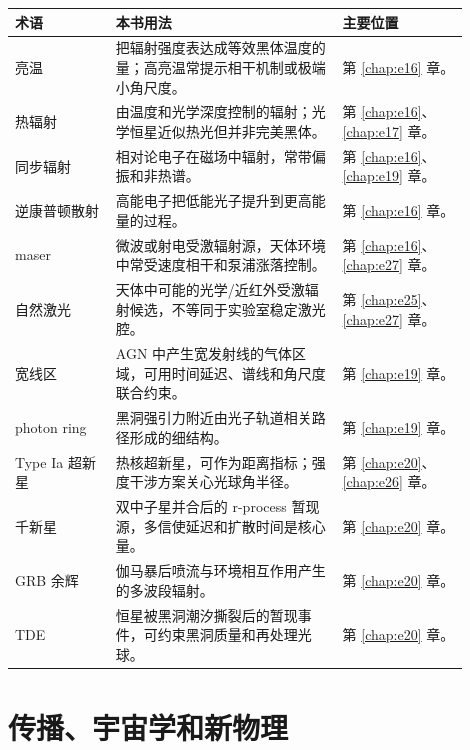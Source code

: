 \begin{longtable}{p{0.20\linewidth}p{0.45\linewidth}p{0.25\linewidth}}
\toprule
术语 & 本书用法 & 主要位置 \\
\midrule
亮温 & 把辐射强度表达成等效黑体温度的量；高亮温常提示相干机制或极端小角尺度。 & 第 \ref{chap:e16} 章。 \\
热辐射 & 由温度和光学深度控制的辐射；光学恒星近似热光但并非完美黑体。 & 第 \ref{chap:e16}、\ref{chap:e17} 章。 \\
同步辐射 & 相对论电子在磁场中辐射，常带偏振和非热谱。 & 第 \ref{chap:e16}、\ref{chap:e19} 章。 \\
逆康普顿散射 & 高能电子把低能光子提升到更高能量的过程。 & 第 \ref{chap:e16} 章。 \\
maser & 微波或射电受激辐射源，天体环境中常受速度相干和泵浦涨落控制。 & 第 \ref{chap:e16}、\ref{chap:e27} 章。 \\
自然激光 & 天体中可能的光学/近红外受激辐射候选，不等同于实验室稳定激光腔。 & 第 \ref{chap:e25}、\ref{chap:e27} 章。 \\
宽线区 & AGN 中产生宽发射线的气体区域，可用时间延迟、谱线和角尺度联合约束。 & 第 \ref{chap:e19} 章。 \\
photon ring & 黑洞强引力附近由光子轨道相关路径形成的细结构。 & 第 \ref{chap:e19} 章。 \\
Type Ia 超新星 & 热核超新星，可作为距离指标；强度干涉方案关心光球角半径。 & 第 \ref{chap:e20}、\ref{chap:e26} 章。 \\
千新星 & 双中子星并合后的 r-process 暂现源，多信使延迟和扩散时间是核心量。 & 第 \ref{chap:e20} 章。 \\
GRB 余辉 & 伽马暴后喷流与环境相互作用产生的多波段辐射。 & 第 \ref{chap:e20} 章。 \\
TDE & 恒星被黑洞潮汐撕裂后的暂现事件，可约束黑洞质量和再处理光球。 & 第 \ref{chap:e20} 章。 \\
\bottomrule
\end{longtable}

\section{传播、宇宙学和新物理}
\label{appsec:c-propagation}

